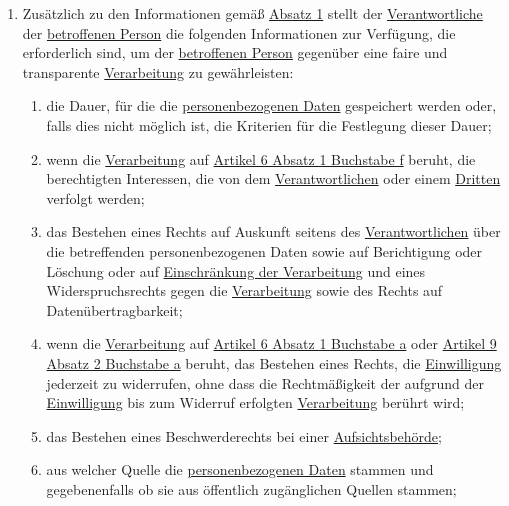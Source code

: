 \begin{enumerate}
\begin{enumerate}
  \end{enumerate}

  \item Zusätzlich zu den Informationen gemäß \hyperref[itm:14-1]{Absatz 1} stellt der \hyperref[itm:04-7]{Verantwortliche} der \hyperref[itm:04-1]{betroffenen
   Person} die folgenden Informationen zur Verfügung, die erforderlich sind, um der \hyperref[itm:04-1]{betroffenen Person} gegenüber eine
   faire und transparente \hyperref[itm:04-2]{Verarbeitung} zu gewährleisten:
  \label{itm:14-2}

  \begin{enumerate}
  
    \item die Dauer, für die die \hyperref[itm:04-1]{personenbezogenen Daten} gespeichert werden oder, falls dies nicht möglich ist, die
     Kriterien für die Festlegung dieser Dauer;
    \label{itm:14-2a}

    \item wenn die \hyperref[itm:04-2]{Verarbeitung} auf \hyperref[itm:06-1f]{Artikel 6 Absatz 1 Buchstabe f} beruht, die berechtigten
     Interessen, die von dem \hyperref[itm:04-7]{Verantwortlichen} oder einem \hyperref[itm:04-10]{Dritten} verfolgt werden;
    \label{itm:14-2b}

    \item das Bestehen eines Rechts auf Auskunft seitens des \hyperref[itm:04-7]{Verantwortlichen} über die betreffenden personenbezogenen
     Daten sowie auf Berichtigung oder Löschung oder auf \hyperref[itm:04-3]{Einschränkung der Verarbeitung} und eines Widerspruchsrechts
     gegen die \hyperref[itm:04-2]{Verarbeitung} sowie des Rechts auf Datenübertragbarkeit;
    \label{itm:14-2c}

    \item wenn die \hyperref[itm:04-2]{Verarbeitung} auf \hyperref[itm:06-1a]{Artikel 6 Absatz 1 Buchstabe a} oder \hyperref[itm:09-2a]
     {Artikel 9 Absatz 2 Buchstabe a} beruht, das Bestehen eines Rechts, die \hyperref[itm:04-11]{Einwilligung} jederzeit zu widerrufen, ohne
     dass die Rechtmäßigkeit der aufgrund der \hyperref[itm:04-11]{Einwilligung} bis zum Widerruf erfolgten \hyperref[itm:04-2]{Verarbeitung} berührt wird;
    \label{itm:14-2d}

    \item das Bestehen eines Beschwerderechts bei einer \hyperref[itm:04-21]{Aufsichtsbehörde};
    \label{itm:14-2e}

    \item aus welcher Quelle die \hyperref[itm:04-1]{personenbezogenen Daten} stammen und gegebenenfalls ob sie aus öffentlich zugänglichen
     Quellen stammen;
    \label{itm:14-2f}


\end{enumerate}
\end{enumerate}
